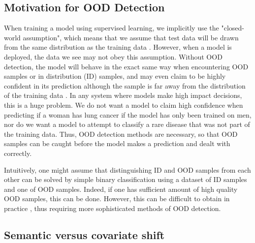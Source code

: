 \documentclass[UKenglish]{uiomasterthesis} %
\theoremstyle{definition}
\begin{document}
\subsection{Motivation for OOD Detection}

When training a model using supervised learning, we implicitly use the "closed-world assumption", which means that we assume that test data will be drawn from the same distribution as the training data \cite{oodoverview}. However, when a model is deployed, the data we see may not obey this assumption. Without OOD detection, the model will behave in the exact same way when encountering OOD samples or in distribution (ID) samples, and may even claim to be highly confident in its prediction although the sample is far away from the distribution of the training data \cite[1]{energy}. In any system where models make high impact decisions, this is a huge problem. We do not want a model to claim high confidence when predicting if a woman has lung cancer if the model has only been trained on men, nor do we want a model to attempt to classify a rare disease that was not part of the training data. Thus, OOD detection methods are necessary, so that OOD samples can be caught before the model makes a prediction and dealt with correctly.

Intuitively, one might assume that distinguishing ID and OOD samples from each other can be solved by simple binary classification using a dataset of ID samples and one of OOD samples. Indeed, if one has sufficient amount of high quality OOD samples, this can be done. However, this can be difficult to obtain in practice \cite[15]{oodoverview}, thus requiring more sophisticated methods of OOD detection.

\subsection{Semantic versus covariate shift}
\end{document}
